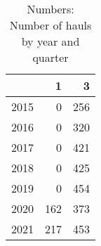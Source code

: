 \begin{table}[ht]
\centering
\begin{tabular}{rrr}
  \hline
 & 1 & 3 \\ 
  \hline
2015 & 0 & 256 \\ 
  2016 & 0 & 320 \\ 
  2017 & 0 & 421 \\ 
  2018 & 0 & 425 \\ 
  2019 & 0 & 454 \\ 
  2020 & 162 & 373 \\ 
  2021 & 217 & 453 \\ 
   \hline
\end{tabular}
\caption{Numbers: Number of hauls by year and quarter} 
\end{table}
